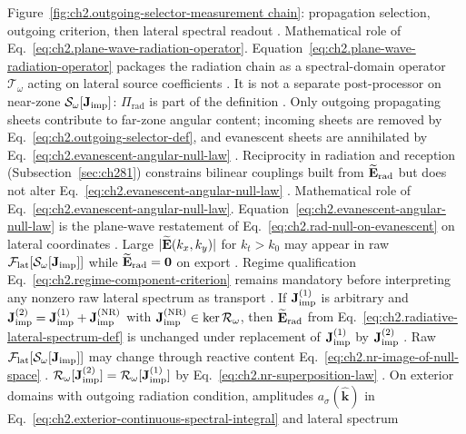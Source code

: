 Figure~\ref{fig:ch2.outgoing-selector-measurement chain}: propagation selection, outgoing criterion, then
lateral spectral readout \cite{stratton1941}.
Mathematical role of Eq.~\eqref{eq:ch2.plane-wave-radiation-operator}. Equation~\eqref{eq:ch2.plane-wave-radiation-operator} packages the radiation chain as a
spectral-domain operator \(\mathcal{T}_\omega\) acting on lateral source coefficients
\cite{stratton1941}. It is not a separate post-processor on near-zone
\(\mathcal{S}_\omega[\mathbf{J}_{\mathrm{imp}}]\): \(\Pi_{\mathrm{rad}}\) is part of the definition
\cite{stratton1941}. Only outgoing propagating sheets contribute to far-zone angular
content; incoming sheets are removed by Eq.~\eqref{eq:ch2.outgoing-selector-def}, and
evanescent sheets are annihilated by Eq.~\eqref{eq:ch2.evanescent-angular-null-law}
\cite{harrington2001}. Reciprocity in radiation and reception (Subsection~\ref{sec:ch281})
constrains bilinear couplings built from \(\widetilde{\mathbf{E}}_{\mathrm{rad}}\) but does not alter
Eq.~\eqref{eq:ch2.evanescent-angular-null-law} \cite{stratton1941}.
Mathematical role of Eq.~\eqref{eq:ch2.evanescent-angular-null-law}. Equation~\eqref{eq:ch2.evanescent-angular-null-law} is the plane-wave restatement of
Eq.~\eqref{eq:ch2.rad-null-on-evanescent} on lateral coordinates \cite{stratton1941}. Large
\(|\widetilde{\mathbf{E}}(k_x,k_y)|\) for \(k_t>k_0\) may appear in raw
\(\mathcal{F}_{\mathrm{lat}}[\mathcal{S}_\omega[\mathbf{J}_{\mathrm{imp}}]]\) while
\(\widetilde{\mathbf{E}}_{\mathrm{rad}}=\mathbf{0}\) on export \cite{harrington2001}. Regime
qualification Eq.~\eqref{eq:ch2.regime-component-criterion} remains mandatory before interpreting any
nonzero raw lateral spectrum as transport \cite{stratton1941}.
\label{prop:ch2.plane-wave-null-invariance}
If \(\mathbf{J}_{\mathrm{imp}}^{(1)}\) is arbitrary and \(\mathbf{J}_{\mathrm{imp}}^{(2)}=\mathbf{J}_{\mathrm{imp}}^{(1)}+\mathbf{J}_{\mathrm{imp}}^{\mathrm{(NR)}}\) with
\(\mathbf{J}_{\mathrm{imp}}^{\mathrm{(NR)}}\in\ker\mathcal{R}_\omega\), then
\(\widetilde{\mathbf{E}}_{\mathrm{rad}}\) from Eq.~\eqref{eq:ch2.radiative-lateral-spectrum-def} is
unchanged under replacement of \(\mathbf{J}_{\mathrm{imp}}^{(1)}\) by \(\mathbf{J}_{\mathrm{imp}}^{(2)}\)
\cite{stratton1941}. Raw \(\mathcal{F}_{\mathrm{lat}}[\mathcal{S}_\omega[\mathbf{J}_{\mathrm{imp}}]]\)
may change through reactive content Eq.~\eqref{eq:ch2.nr-image-of-null-space}
\cite{stratton1941}. \(\mathcal{R}_\omega[\mathbf{J}_{\mathrm{imp}}^{(2)}]=\mathcal{R}_\omega[\mathbf{J}_{\mathrm{imp}}^{(1)}]\) by
Eq.~\eqref{eq:ch2.nr-superposition-law} \cite{stratton1941}.
\label{prop:ch2.plane-wave-continuous-consistency}
On exterior domains with outgoing radiation condition, amplitudes \(a_\sigma(\widehat{\mathbf{k}})\) in
Eq.~\eqref{eq:ch2.exterior-continuous-spectral-integral} and lateral spectrum
